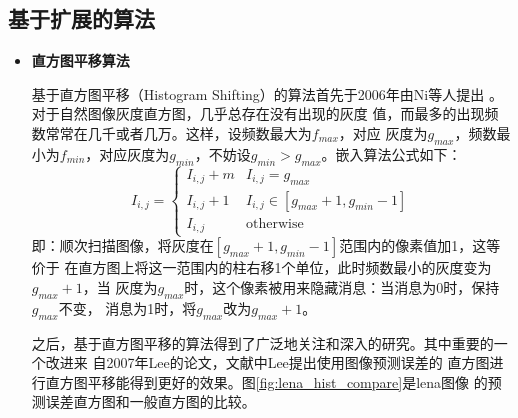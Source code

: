 \subsection{基于扩展的算法}
\begin{itemize}
  \setlength{\parindent}{2em}
  \vspace{-2mm}
  \item \textbf{直方图平移算法}
    \vspace{-2mm}
    \par
    基于直方图平移（Histogram Shifting）的算法首先于2006年由Ni等人提出
    \cite{ni2006reversible}。对于自然图像灰度直方图，几乎总存在没有出现的灰度
    值，而最多的出现频数常常在几千或者几万。这样，设频数最大为$f_{max}$，对应
    灰度为$g_{max}$，频数最小为$f_{min}$，对应灰度为$g_{min}$，不妨设$g_{min}>
    g_{max}$。嵌入算法公式如下：
    \begin{equation}
      \label{eq:histo_shift_embedding}
      I_{i,j}=\left\{ \begin{array}{ll}
        I_{i,j}+m & \textrm{$I_{i,j}=g_{max}$}\\
        I_{i,j}+1 & \textrm{$I_{i,j} \in [g_{max}+1,g_{min}-1]$}\\
        I_{i,j}   & \textrm{otherwise}
      \end{array} \right.
    \end{equation}
    即：顺次扫描图像，将灰度在$[g_{max}+1,g_{min}-1]$范围内的像素值加1，这等价于
    在直方图上将这一范围内的柱右移1个单位，此时频数最小的灰度变为$g_{max}+1$，当
    灰度为$g_{max}$时，这个像素被用来隐藏消息：当消息为0时，保持$g_{max}$不变，
    消息为1时，将$g_{max}$改为$g_{max}+1$。
    \par
    之后，基于直方图平移的算法得到了广泛地关注和深入的研究。其中重要的一个改进来
    自2007年Lee的论文\cite{lee2006reversiblee}，文献中Lee提出使用图像预测误差的
    直方图进行直方图平移能得到更好的效果。图\ref{fig:lena_hist_compare}是lena图像
    的预测误差直方图和一般直方图的比较。
    \begin{figure}[!hbt]
    \centering 
\end{figure}
\end{itemize}
